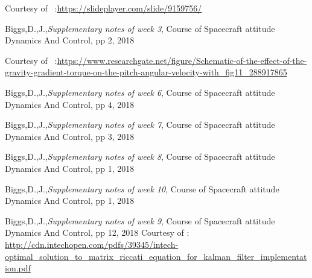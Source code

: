\documentclass[11pt]{article}
\begin{document}
\begin{thebibliography}{}
Courtesy of \ :\url{https://slideplayer.com/slide/9159756/} 

Biggs,D.,J.,\textit{Supplementary notes of week 3}, Course of Spacecraft attitude Dynamics And Control, pp 2, 2018

Courtesy of \ :\url{https://www.researchgate.net/figure/Schematic-of-the-effect-of-the-gravity-gradient-torque-on-the-pitch-angular-velocity-with_fig11_288917865} 

Biggs,D.,J.,\textit{Supplementary notes of week 6}, Course of Spacecraft attitude Dynamics And Control, pp 4, 2018 

Biggs,D.,J.,\textit{Supplementary notes of week 7}, Course of Spacecraft attitude Dynamics And Control, pp 3, 2018 

Biggs,D.,J.,\textit{Supplementary notes of week 8}, Course of Spacecraft attitude Dynamics And Control, pp 1, 2018 

Biggs,D.,J.,\textit{Supplementary notes of week 10}, Course of Spacecraft attitude Dynamics And Control, pp 1, 2018 

Biggs,D.,J.,\textit{Supplementary notes of week 9}, Course of Spacecraft attitude Dynamics And Control, pp 12, 2018 
Courtesy of : \url{http://cdn.intechopen.com/pdfs/39345/intech-optimal_solution_to_matrix_riccati_equation_for_kalman_filter_implementation.pdf}
 \end{thebibliography}{}

 
\end{document}
